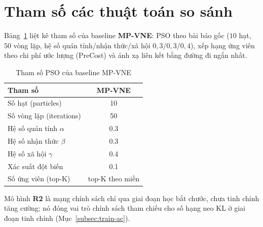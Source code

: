 \documentclass[../DoAn.tex]{subfiles}
\begin{document}
\section{Tham số các thuật toán so sánh}
\label{sec:app-baselines}

Bảng~\ref{tab:app-baseline-params} liệt kê tham số của baseline \textbf{MP-VNE}: PSO theo bài báo gốc ($10$ hạt, $50$ vòng lặp, hệ số quán tính/nhận thức/xã hội $0{,}3/0{,}3/0{,}4$), xếp hạng ứng viên theo chi phí ước lượng (PreCost) và ánh xạ liên kết bằng đường đi ngắn nhất.

\begin{table}[H]
\centering
\caption{Tham số PSO của baseline MP-VNE}
\label{tab:app-baseline-params}
\begin{tabular}{lc}
\toprule
\textbf{Tham số} & \textbf{MP-VNE} \\
\midrule
Số hạt (particles)        & 10 \\
Số vòng lặp (iterations)  & 50 \\
Hệ số quán tính $\alpha$  & 0.3 \\
Hệ số nhận thức $\beta$   & 0.3 \\
Hệ số xã hội $\gamma$     & 0.4 \\
Xác suất đột biến         & 0.1 \\
Số ứng viên (top-K)       & top-K theo miền \\
\bottomrule
\end{tabular}
\end{table}

Mô hình \textbf{R2} là mạng chính sách chỉ qua giai đoạn học bắt chước, chưa tinh chỉnh tăng cường; nó đóng vai trò chính sách tham chiếu cho số hạng neo KL ở giai đoạn tinh chỉnh (Mục~\ref{subsec:train-ac}).
\end{document}
